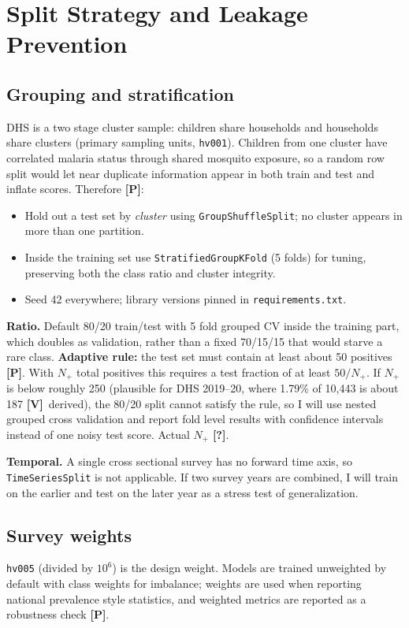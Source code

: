 \documentclass[11pt,a4paper]{article}
\newcommand{\V}{\textbf{[V]}}   %
\newcommand{\Pl}{\textbf{[P]}}   %
\newcommand{\Q}{\textbf{[?]}}   %
\begin{document}
\section{Split Strategy and Leakage Prevention}
\subsection{Grouping and stratification}
DHS is a two stage cluster sample: children share households and households share clusters (primary sampling units, \texttt{hv001}). Children from one cluster have correlated malaria status through shared mosquito exposure, so a random row split would let near duplicate information appear in both train and test and inflate scores. Therefore \Pl:
\begin{itemize}
\item Hold out a test set by \emph{cluster} using \texttt{GroupShuffleSplit}; no cluster appears in more than one partition.
\item Inside the training set use \texttt{StratifiedGroupKFold} (5 folds) for tuning, preserving both the class ratio and cluster integrity.
\item Seed 42 everywhere; library versions pinned in \texttt{requirements.txt}.
\end{itemize}
\textbf{Ratio.} Default 80/20 train/test with 5 fold grouped CV inside the training part, which doubles as validation, rather than a fixed 70/15/15 that would starve a rare class. \textbf{Adaptive rule:} the test set must contain at least about 50 positives \Pl. With $N_+$ total positives this requires a test fraction of at least $50/N_+$. If $N_+$ is below roughly 250 (plausible for DHS 2019--20, where 1.79\% of 10,443 is about 187 \V\ derived), the 80/20 split cannot satisfy the rule, so I will use nested grouped cross validation and report fold level results with confidence intervals instead of one noisy test score. Actual $N_+$ \Q.

\textbf{Temporal.} A single cross sectional survey has no forward time axis, so \texttt{TimeSeriesSplit} is not applicable. If two survey years are combined, I will train on the earlier and test on the later year as a stress test of generalization.

\subsection{Survey weights}
\texttt{hv005} (divided by $10^6$) is the design weight. Models are trained unweighted by default with class weights for imbalance; weights are used when reporting national prevalence style statistics, and weighted metrics are reported as a robustness check \Pl.
\end{document}
